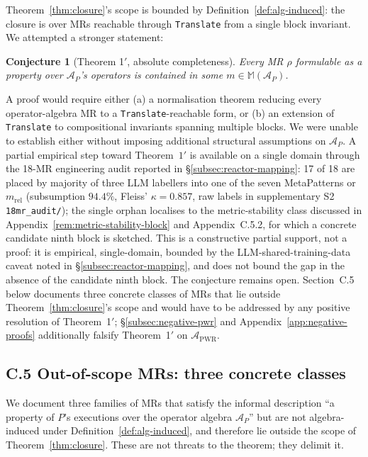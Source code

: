 \documentclass[acmsmall, screen]{acmart}
\newtheorem*{conjecture*}{Conjecture}
\begin{document}
Theorem~\ref{thm:closure}'s scope is bounded by Definition~\ref{def:alg-induced}: the closure is over MRs reachable through \texttt{Translate} from a single block invariant. We attempted a stronger statement:

\begin{conjecture*}[Theorem 1$'$, absolute completeness]
\label{conj:absolute}
Every MR $\rho$ formulable as a property over $\mathcal{A}_P$'s operators is contained in some $m \in \mathbb{M}(\mathcal{A}_P)$.
\end{conjecture*}

A proof would require either (a) a normalisation theorem reducing every operator-algebra MR to a \texttt{Translate}-reachable form, or (b) an extension of \texttt{Translate} to compositional invariants spanning multiple blocks. We were unable to establish either without imposing additional structural assumptions on $\mathcal{A}_P$. A partial empirical step toward Theorem~$1'$ is available on a single domain through the 18-MR engineering audit reported in \S\ref{subsec:reactor-mapping}: 17 of 18 are placed by majority of three LLM labellers into one of the seven MetaPatterns or $m_{\mathrm{rel}}$ (subsumption $94.4\%$, Fleiss' $\kappa = 0.857$, raw labels in supplementary S2 \texttt{18mr\_audit/}); the single orphan localises to the metric-stability class discussed in Appendix~\ref{rem:metric-stability-block} and Appendix~C.5.2, for which a concrete candidate ninth block is sketched. This is a constructive partial support, not a proof: it is empirical, single-domain, bounded by the LLM-shared-training-data caveat noted in \S\ref{subsec:reactor-mapping}, and does not bound the gap in the absence of the candidate ninth block. The conjecture remains open. Section~C.5 below documents three concrete classes of MRs that lie outside Theorem~\ref{thm:closure}'s scope and would have to be addressed by any positive resolution of Theorem~1$'$; \S\ref{subsec:negative-pwr} and Appendix~\ref{app:negative-proofs} additionally falsify Theorem~1$'$ on $\mathcal{A}_{\mathrm{PWR}}$.

\subsection*{C.5 Out-of-scope MRs: three concrete classes}
\label{app:out-of-scope}

We document three families of MRs that satisfy the informal description ``a property of $P$'s executions over the operator algebra $\mathcal{A}_P$'' but are not algebra-induced under Definition~\ref{def:alg-induced}, and therefore lie outside the scope of Theorem~\ref{thm:closure}. These are not threats to the theorem; they delimit it.
\end{document}
